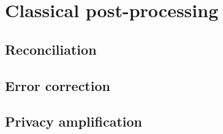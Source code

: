 \section{Classical post-processing}

\subsection{Reconciliation}

\subsection{Error correction}

\subsection{Privacy amplification}

